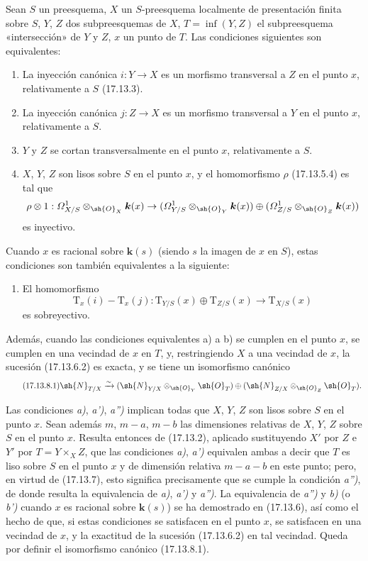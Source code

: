 \begin{proposition}[17.13.8]
\label{IV.17.13.8}
Sean $S$ un preesquema, $X$ un $S$-preesquema localmente de presentación finita sobre $S$, $Y$, $Z$ dos subpreesquemas de $X$, $T=\inf(Y,Z)$ el subpreesquema «intersección» de $Y$ y $Z$, $x$ un punto de $T$. Las condiciones siguientes son equivalentes:
\begin{enumerate}
  \item[\textup{a)}] La inyección canónica $i:Y\to X$ es un morfismo transversal a $Z$ en el punto $x$, relativamente a $S$ \textup{(17.13.3)}.
  \item[\textup{a$'$)}] La inyección canónica $j:Z\to X$ es un morfismo transversal a $Y$ en el punto $x$, relativamente a $S$.
  \item[\textup{a$''$)}] $Y$ y $Z$ se cortan transversalmente en el punto $x$, relativamente a $S$.
  \item[\textup{b)}] $X$, $Y$, $Z$ son lisos sobre $S$ en el punto $x$, y el homomorfismo $\rho$ \textup{(17.13.5.4)} es tal que
  \[
  \rho\otimes1:\varOmega^1_{X/S}\otimes_{\sh{O}_X}\boldsymbol k(x)\to
  (\varOmega^1_{Y/S}\otimes_{\sh{O}_Y}\boldsymbol k(x))\oplus
  (\varOmega^1_{Z/S}\otimes_{\sh{O}_Z}\boldsymbol k(x))
  \]
  es inyectivo.
\end{enumerate}
Cuando $x$ es racional sobre $\boldsymbol k(s)$ \textup{(}siendo $s$ la imagen de $x$ en $S$\textup{)}, estas condiciones son también equivalentes a la siguiente:
\begin{enumerate}
  \item[\textup{b$'$)}] El homomorfismo
  \[
  \mathrm{T}_x(i)-\mathrm{T}_x(j):\mathrm{T}_{Y/S}(x)\oplus\mathrm{T}_{Z/S}(x)\to\mathrm{T}_{X/S}(x)
  \]
  es sobreyectivo.
\end{enumerate}
Además, cuando las condiciones equivalentes \textup{a)} a \textup{b)} se cumplen en el punto $x$, se cumplen en una vecindad de $x$ en $T$, y, restringiendo $X$ a una vecindad de $x$, la sucesión \textup{(17.13.6.2)} es exacta, y se tiene un isomorfismo canónico
\[
\label{IV.17.13.8.1}
\tag{17.13.8.1}
\sh{N}_{T/X}\xrightarrow{\sim}
(\sh{N}_{Y/X}\otimes_{\sh{O}_Y}\sh{O}_T)\oplus
(\sh{N}_{Z/X}\otimes_{\sh{O}_Z}\sh{O}_T).
\]
\end{proposition}

Las condiciones \emph{a)}, \emph{a')}, \emph{a'')} implican todas que $X$, $Y$, $Z$ son lisos sobre $S$ en el punto $x$. Sean además $m$, $m-a$, $m-b$ las dimensiones relativas de $X$, $Y$, $Z$ sobre $S$ en el punto $x$. Resulta entonces de (17.13.2), aplicado sustituyendo $X'$ por $Z$ e $Y'$ por $T=Y\times_XZ$, que las condiciones \emph{a)}, \emph{a')} equivalen ambas a decir que $T$ es liso sobre $S$ en el punto $x$ y de dimensión relativa $m-a-b$ en este punto; pero, en virtud de (17.13.7), esto significa precisamente que se cumple la condición \emph{a'')}, de donde resulta la equivalencia de \emph{a)}, \emph{a')} y \emph{a'')}. La equivalencia de \emph{a'')} y \emph{b)} (o \emph{b')} cuando $x$ es racional sobre $\boldsymbol k(s)$) se ha demostrado en (17.13.6), así como el hecho de que, si estas condiciones se satisfacen en el punto $x$, se satisfacen en una vecindad de $x$, y la exactitud de la sucesión (17.13.6.2) en tal vecindad. Queda por definir el isomorfismo canónico (17.13.8.1).

